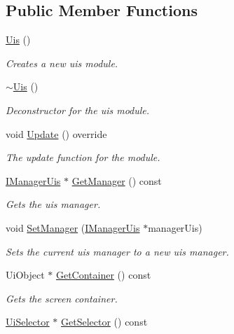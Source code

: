 \subsection*{Public Member Functions}
\begin{DoxyCompactItemize}
\item 
\hyperlink{class_flounder_1_1_uis_ae9a32272547373defb5abfc0bf9407a4}{Uis} ()
\begin{DoxyCompactList}\small\item\em Creates a new uis module. \end{DoxyCompactList}\item 
\hyperlink{class_flounder_1_1_uis_a2b36cc1c0c8da3a21344c61e00481eb8}{$\sim$\+Uis} ()
\begin{DoxyCompactList}\small\item\em Deconstructor for the uis module. \end{DoxyCompactList}\item 
void \hyperlink{class_flounder_1_1_uis_a373eafdf7d64c6250294b01567124046}{Update} () override
\begin{DoxyCompactList}\small\item\em The update function for the module. \end{DoxyCompactList}\item 
\hyperlink{class_flounder_1_1_i_manager_uis}{I\+Manager\+Uis} $\ast$ \hyperlink{class_flounder_1_1_uis_ace96fb2e4ff722c50d69d6809768e190}{Get\+Manager} () const
\begin{DoxyCompactList}\small\item\em Gets the uis manager. \end{DoxyCompactList}\item 
void \hyperlink{class_flounder_1_1_uis_a300312224eb6409b14c3e7f7d72d7b65}{Set\+Manager} (\hyperlink{class_flounder_1_1_i_manager_uis}{I\+Manager\+Uis} $\ast$manager\+Uis)
\begin{DoxyCompactList}\small\item\em Sets the current uis manager to a new uis manager. \end{DoxyCompactList}\item 
Ui\+Object $\ast$ \hyperlink{class_flounder_1_1_uis_a2b570c5016d66eff53caaf9df9af3b06}{Get\+Container} () const
\begin{DoxyCompactList}\small\item\em Gets the screen container. \end{DoxyCompactList}\item 
\hyperlink{class_flounder_1_1_ui_selector}{Ui\+Selector} $\ast$ \hyperlink{class_flounder_1_1_uis_abf39b143497e3c9b72b4c847ec3128bb}{Get\+Selector} () const

\end{DoxyCompactItemize}
